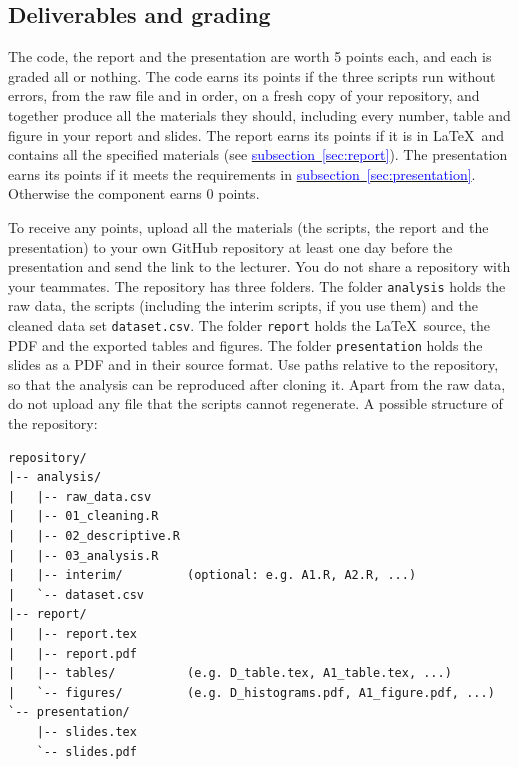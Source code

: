 \documentclass[11pt,a4paper]{article}
\begin{document}
\subsection{Deliverables and grading}\label{sec:deliverables}

The code, the report and the presentation are worth 5 points each, and each is graded all or nothing. The code earns its points if the three scripts run without errors, from the raw file and in order, on a fresh copy of your repository, and together produce all the materials they should, including every number, table and figure in your report and slides. The report earns its points if it is in \LaTeX\ and contains all the specified materials (see \hyperref[sec:report]{\textcolor{blue}{subsection~\ref*{sec:report}}}). The presentation earns its points if it meets the requirements in \hyperref[sec:presentation]{\textcolor{blue}{subsection~\ref*{sec:presentation}}}. Otherwise the component earns 0 points.

To receive any points, upload all the materials (the scripts, the report and the presentation) to your own GitHub repository at least one day before the presentation and send the link to the lecturer. You do not share a repository with your teammates. The repository has three folders. The folder \texttt{analysis} holds the raw data, the scripts (including the interim scripts, if you use them) and the cleaned data set \texttt{dataset.csv}. The folder \texttt{report} holds the \LaTeX\ source, the PDF and the exported tables and figures. The folder \texttt{presentation} holds the slides as a PDF and in their source format. Use paths relative to the repository, so that the analysis can be reproduced after cloning it. Apart from the raw data, do not upload any file that the scripts cannot regenerate. A possible structure of the repository:

\begin{minipage}{\linewidth}
\footnotesize
\begin{verbatim}
repository/
|-- analysis/
|   |-- raw_data.csv
|   |-- 01_cleaning.R
|   |-- 02_descriptive.R
|   |-- 03_analysis.R
|   |-- interim/         (optional: e.g. A1.R, A2.R, ...)
|   `-- dataset.csv
|-- report/
|   |-- report.tex
|   |-- report.pdf
|   |-- tables/          (e.g. D_table.tex, A1_table.tex, ...)
|   `-- figures/         (e.g. D_histograms.pdf, A1_figure.pdf, ...)
`-- presentation/
    |-- slides.tex
    `-- slides.pdf
\end{verbatim}
\end{minipage}
\end{document}

